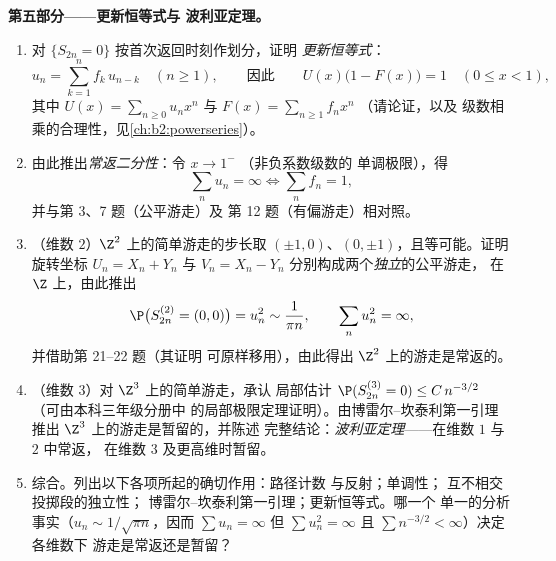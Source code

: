 \begin{problem}
\medskip
\noindent\textbf{第五部分——更新恒等式与
波利亚定理。}
\begin{enumerate}[resume]
  \item 对 $\{S_{2n} = 0\}$ 按首次返回时刻作划分，证明
        \emph{更新恒等式}：
        \[
        u_n = \sum_{k=1}^n f_k\,u_{n-k} \quad (n \geq 1),
        \qquad\text{因此}\qquad
        U(x)\bigl(1 - F(x)\bigr) = 1 \quad (0 \leq x < 1),
        \]
        其中 $U(x) = \sum_{n\geq0}u_nx^n$ 与 $F(x) =
        \sum_{n\geq1}f_nx^n$ （请论证，以及
        级数相乘的合理性，见\cref{ch:b2:powerseries}）。
  \item 由此推出\emph{常返二分性}：令 $x
        \to 1^-$ （非负系数级数的
        单调极限），得
        \[
        \sum_n u_n = \infty \iff \sum_n f_n = 1 ,
        \]
        并与第 3、7 题（公平游走）及
        第 12 题（有偏游走）相对照。
  \item （维数 $2$）$\Z^2$ 上的简单游走的步长取
        $(\pm1, 0)$、$(0, \pm1)$，且等可能。证明
        旋转坐标 $U_n = X_n + Y_n$ 与 $V_n = X_n
        - Y_n$ 分别构成两个\emph{独立}的公平游走，
        在 $\Z$ 上，由此推出
        \[
        \P\bigl(S^{(2)}_{2n} = (0,0)\bigr) = u_n^2 \sim
        \frac1{\pi n},
        \qquad \sum_n u_n^2 = \infty ,
        \]
        并借助第 21--22 题（其证明
        可原样移用），由此得出
        $\Z^2$ 上的游走是常返的。
  \item （维数 $3$）对 $\Z^3$ 上的简单游走，承认
        局部估计 $\P(S^{(3)}_{2n} = 0) \leq
        C\,n^{-3/2}$ （可由本科三年级分册中
        的局部极限定理证明）。由博雷尔--坎泰利第一引理推出
        $\Z^3$ 上的游走是暂留的，并陈述
        完整结论：\emph{波利亚定理}——在维数 $1$ 与 $2$ 中常返，
        在维数 $3$ 及更高维时暂留。
  \item 综合。列出以下各项所起的确切作用：路径计数
        与反射；单调性；
        互不相交投掷段的独立性；
        博雷尔--坎泰利第一引理；更新恒等式。哪一个
        单一的分析事实（$u_n \sim 1/\sqrt{\pi n}$，因而
        $\sum u_n = \infty$ 但 $\sum u_n^2 = \infty$ 且
        $\sum n^{-3/2} < \infty$）决定各维数下
        游走是常返还是暂留？
\end{enumerate}
\end{problem}
